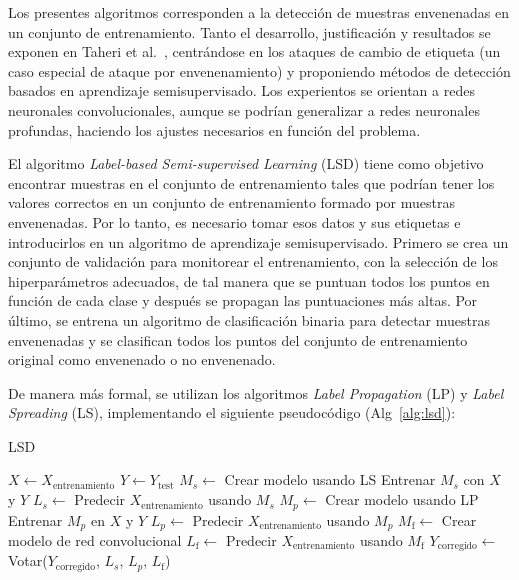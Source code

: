 Los presentes algoritmos corresponden a la detección de muestras envenenadas en un conjunto de entrenamiento. Tanto el desarrollo, justificación y resultados se exponen en Taheri et al.~\cite{Clustering}, centrándose en los ataques de cambio de etiqueta (un caso especial de ataque por envenenamiento) y proponiendo métodos de detección basados en aprendizaje semisupervisado. Los experientos se orientan a redes neuronales convolucionales, aunque se podrían generalizar a redes neuronales profundas, haciendo los ajustes necesarios en función del problema.

El algoritmo \textit{Label-based Semi-supervised Learning} (LSD) tiene como objetivo encontrar muestras en el conjunto de entrenamiento tales que podrían tener los valores correctos en un conjunto de entrenamiento formado por muestras envenenadas. Por lo tanto, es necesario tomar esos datos y sus etiquetas e introducirlos en un algoritmo de aprendizaje semisupervisado. Primero se crea un conjunto de validación para monitorear el entrenamiento, con la selección de los hiperparámetros adecuados, de tal manera que se puntuan todos los puntos en función de cada clase y después se propagan las puntuaciones más altas. Por último, se entrena un algoritmo de clasificación binaria para detectar muestras envenenadas y se clasifican todos los puntos del conjunto de entrenamiento original como envenenado o no envenenado.

De manera más formal, se utilizan los algoritmos \textit{Label Propagation} (LP) y \textit{Label Spreading} (LS), implementando el siguiente pseudocódigo (Alg~\ref{alg:lsd}):

\begin{algorithm}
\caption{LSD}\label{alg:lsd}
\BlankLine
$X \leftarrow X_{\text{entrenamiento}}$\;
$Y \leftarrow Y_{\text{test}}$\;
$M_s \leftarrow$ Crear modelo usando LS\;
Entrenar $M_s$ con $X$ y $Y$\;
$L_s \leftarrow$ Predecir $X_{\text{entrenamiento}}$ usando $M_s$\;
$M_p \leftarrow$ Crear modelo usando LP\;
Entrenar $M_p$ en $X$ y $Y$\;
$L_p \leftarrow$ Predecir $X_{\text{entrenamiento}}$ usando $M_p$\;
$M_{\text{f}} \leftarrow$ Crear modelo de red convolucional\;
$L_{\text{f}} \leftarrow$ Predecir $X_{\text{entrenamiento}}$ usando $M_{\text{f}}$\;
$Y_{\text{corregido}} \leftarrow$ Votar($Y_{\text{corregido}}$, $L_s$, $L_p$, $L_{\text{f}}$)\;
\end{algorithm}

